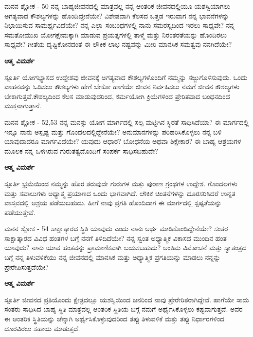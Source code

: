 \newpage
\begin{mananam}{\mananamfont ಮನನ ಶ್ಲೋಕ - \textenglish{50}}
\footnotesize \mananamtext ನನ್ನ ಬಾಹ್ಯಜೀವನದಲ್ಲಿ ಮಾತ್ರವಲ್ಲ ನನ್ನ ಆಂತರಿಕ ಜೀವನದಲ್ಲಿಯೂ ಯಶಸ್ವಿಯಾಗಲು ಅಗತ್ಯವಾದ ಕೌಶಲ್ಯಗಳನ್ನು ಹೊಂದಿದ್ದೇನೆಯೇ? ವಿಶೇಷವಾಗಿ ಕೆಲಸದ ಒತ್ತಡ ಇರುವಾಗ ನನ್ನ ಭಾವನೆಗಳನ್ನು ನಿಭಾಯಿಸುವ ಸಾಮರ್ಥ್ಯವಿದೆಯೇ? ನನ್ನ ಎಲ್ಲಾ ಸಂಬಂಧಗಳಲ್ಲಿ ನಾನು  ಸಮರಸ್ಯದಿಂದ ಇರಲು ಸಾಧ್ಯವೇ? ನನ್ನ ಸಮತೋಮುಖ ಯೋಗಕ್ಷೇಮಕ್ಕಾಗಿ ಮಾಡುವ ಪ್ರಯತ್ನಗಳಲ್ಲಿ ತಾಳ್ಮೆ ಮತ್ತು ನಿರಂತರತೆಯನ್ನು ಹೊಂದಿರಲು ಸಾಧ್ಯವೇ? ಗೀತೆಯ ದೃಷ್ಟಿಕೋನದಂತೆ ಈ ಲೌಕಿಕ ಲಾಭ ನಷ್ಟವನ್ನು ಮೀರಿ ಮಾನಸಿಕ ಸಮತ್ವವು ನನಗಿದೆಯೇ?
\end{mananam}
\WritingHand\enspace\textbf{ಆತ್ಮ ವಿಮರ್ಶೆ}
\begin{inspiration}{\mananamfont ಸ್ಪೂರ್ತಿ}
\footnotesize \mananamtext ಯೋಗಭ್ಯಾಸದ ಉದ್ದೇಶವು ಜೀವನಕ್ಕೆ ಅಗತ್ಯವಾದ ಕೌಶಲ್ಯಗಳೊಂದಿಗೆ ನಮ್ಮನ್ನು ಸಜ್ಜುಗೊಳಿಸುವುದು. ಒಂದು ವಾಹನವನ್ನು ಓಡಿಸಲು ಕೌಶಲ್ಯಗಳು ಹೇಗೆ ಬೇಕೋ ಹಾಗೆಯೇ ಜೀವನ ನಿರ್ವಹಿಸಲು ನಮಗೆ ಜೀವನ ಕೌಶಲ್ಯಗಳು ಬೇಕಾಗುತ್ತವೆ.ಕೌಶಲ್ಯದಿಂದ ಕೆಲಸ ಮಾಡುವುದರಿಂದ, ಕರ್ಮಯೋಗಿ ಕ್ರಿಯೆಗಳಿಂದ ಪ್ರೇರಿತವಾದ ಬಂಧನದಿಂದ ಮುಕ್ತನಾಗುತ್ತಾನೆ.
\end{inspiration}
\newpage



\newpage
\begin{mananam}{\mananamfont ಮನನ ಶ್ಲೋಕ - \textenglish{52,53}}
\footnotesize \mananamtext ನನ್ನ ಮನಸ್ಸು ಯೋಗ ಮಾರ್ಗದಲ್ಲಿ ಸಲ್ಪ ಮಟ್ಟಿಗಿನ ಸ್ಥಿರತೆ ಸಾಧಿಸಿದೆಯಾ? ಈ ಮಾರ್ಗದಲ್ಲಿ ಇನ್ನೂ ನಾನು ಅಸ್ಪೃಷ್ಟ  ಮತ್ತು ಗೊಂದಲದಲ್ಲಿದ್ದೇನೆಯೇ? ಅನುಮಾನಗಳನ್ನು ಪರಿಹರಿಸಿಕೊಳ್ಳಲು ನನ್ನ ಬಳಿ ಯಾವುದಾದರೂ ಮಾರ್ಗವಿದೆಯೇ? ಯವುದು ಆಧಾರ? ಬೋಧನೆಯ ಅಥವಾ ಶಿಕ್ಷೇಕಾರ? ಈ ಬಾಹ್ಯ ಆಶ್ರಯಗಳ ಮೂಲಕ ನನ್ನ ಒಳಗಿರುವ ಗುರುತತ್ವದೊಂದಿಗೆ ಸಂಪರ್ಕ ಸಾಧಿಸಬಹುದೇ?
\end{mananam}
\WritingHand\enspace\textbf{ಆತ್ಮ ವಿಮರ್ಶೆ}
\begin{inspiration}{\mananamfont ಸ್ಪೂರ್ತಿ}
\footnotesize \mananamtext ಭ್ರಮೆಯಿಂದ ನಮ್ಮನ್ನು ಹೊರ ತರುವುದೇ ಗುರುಗಳ ಮತ್ತು ಪುರಾಣ ಗ್ರಂಥಗಳ ಉದ್ದೇಶ. ಗೊಂದಲಗಳು ಮತ್ತು ಸವಾಲುಗಳು ಅಧ್ಯಾತ್ಮ ಪ್ರಯಾಣದ ಒಂದು ಭಾಗವಾಗಿದೆ. ಲೌಕಿಕ ಚಿಂತನೆಗಳನ್ನು ದೂರಸರಿಸಿದರೆ ಉನ್ನತ ವಾಸ್ತವದಲ್ಲಿ ಆಶ್ರಯ ಪಡೆಯಬಹುದು. ಹೀಗೆ ನಾವು ಪ್ರಗತಿ ಹೊಂದಿದಾಗ ಈ ಮಾರ್ಗದಲ್ಲಿ ಸ್ಪಷ್ಟತೆಯನ್ನು ಪಡೆಯುತ್ತೇವೆ.
\end{inspiration}
\newpage


\newpage
\begin{mananam}{\mananamfont ಮನನ ಶ್ಲೋಕ - \textenglish{54}}
\footnotesize \mananamtext ಸಾಕ್ಷಾತ್ಕಾರದ ಸ್ಥಿತಿ ಯಾವುದು ಎಂದು ನಾನು ಅರ್ಥ ಮಾಡಿಕೊಂಡಿದ್ದೇನೆಯೇ? ಸಂತರ ಸಾಕ್ಷಾತ್ಕಾರದ  ವಿವಿಧ ಹಂತಗಳ ಬಗ್ಗೆ ನನಗೆ ತಿಳಿದಿದೆಯೇ? ನನ್ನ ಸ್ವಂತ ಅಧ್ಯಾತ್ಮಿಕ ವಿಕಾಸದ ಮುಂದಿನ ಹಂತ ಯಾವುದು? ನಾನು ಯಾವ ಹಂತವನ್ನು ಪ್ರಾಮಾಣಿಕವಾಗಿ ಬಯಸಬಹುದು? ಅಂತಿಮ ವಿಮೋಚನೆ ಮತ್ತು ಸ್ವಾತಂತ್ರದ ಬಗ್ಗೆ ನನ್ನ ತಿಳುವಳಿಕೆಯು ನನ್ನ ಜೀವನದಲ್ಲಿ ಮಾನಸಿಕ ಮತ್ತು ಅಧ್ಯಾತ್ಮಿಕ ಪ್ರಗತಿಯನ್ನು ಮಾಡಲು  ನನ್ನನ್ನು ಪ್ರೇರೇಪಿಸುತ್ತದೆಯೇ?
\end{mananam}
\WritingHand\enspace\textbf{ಆತ್ಮ ವಿಮರ್ಶೆ}
\begin{inspiration}{\mananamfont ಸ್ಪೂರ್ತಿ}
\footnotesize \mananamtext
 ಜೀವನದ ಪ್ರತಿಯೊಂದು ಕ್ಷೇತ್ರದಲ್ಲೂ ಯಶಸ್ವಿಯಿಂದ ಜನರಿಂದ ನಾವು ಪ್ರೇರೇರಿತರಾಗಿದ್ದೇವೆ. ಹಾಗೆಯೇ ಸಾದು ಸಂತರು ಸಾಧಿಸಿದ ಬಾಹ್ಯ ಸ್ಥಿತಿ ಮಾತ್ರವಲ್ಲ ಆಂತರಿಕ ಸ್ಥಿತಿಯ ಬಗ್ಗೆ ನಮಗೆ ಅರ್ಥೈಸಿಕೊಳ್ಳಲು ಕಷ್ಟವಾಗುತ್ತದೆ. ಅವರ ಈ ಆಂತರಿಕ ಸ್ಥಿತಿಯನ್ನು ಚೆನ್ನಾಗಿ ಅರ್ಥೈಸಿಕೊಳ್ಳುವುದರಿಂದ ತಪ್ಪು ತಿಳುವಳಿಕೆ ಮತ್ತು ತಪ್ಪು ನಿರ್ಧಾರಗಳಿಂದ ದೂರವಿರಲು ಸಹಾಯ ಮಾಡುತ್ತದೆ.
\end{inspiration}
\newpage



